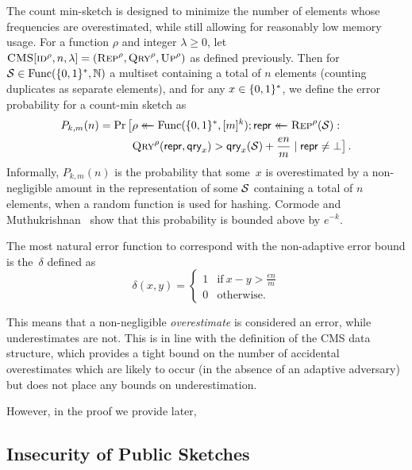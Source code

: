 %
The count min-sketch is designed to minimize the number of elements whose
frequencies are overestimated, while still allowing for reasonably low memory
usage. For a function $\rho$ and integer $\lambda\ge0$, let
$\textnormal{\textsc{CMS}}[\textnormal{\textsc{id}}^\rho,n,\lambda] = (\textnormal{\textsc{Rep}}^\rho,\textnormal{\textsc{Qry}}^\rho,\textnormal{\textsc{Up}}^\rho)$ as defined
previously. Then for $\mathcal{S} \in \mathrm{Func}(\{0,1\}^*,\mathbb{N})$ a multiset containing a total
of $n$ elements (counting duplicates as separate elements), and for any
$x \in \{0,1\}^*$, we define the error probability for a count-min sketch as
\begin{equation}\label{eq:bf-fp}
  \begin{aligned}
    P_{k,m}(n) =
      \Pr\big[&\rho \mathrel{\leftarrow\mkern-14mu\leftarrow} \mathrm{Func}(\{0,1\}^*,[m]^k);
              \mathsf{repr} \mathrel{\leftarrow\mkern-14mu\leftarrow} \textnormal{\textsc{Rep}}^\rho(\mathcal{S}): \\
              &\textnormal{\textsc{Qry}}^\rho(\mathsf{repr}, \mathsf{qry}_x) > \mathsf{qry}_x(\mathcal{S})+\frac{en}{m} \mid \mathsf{repr} \ne \bot
      \big] \,.
  \end{aligned}
\end{equation}
Informally, $P_{k,m}(n)$ is the probability that some~$x$ is overestimated by a
non-negligible amount in the representation of some $\mathcal{S}$ containing a total
of $n$ elements, when a random function is used for hashing. Cormode and
Muthukrishnan~\cite{cormode2005improved} show that this probability is bounded
above by $e^{-k}$.

%
The most natural error function to correspond with the non-adaptive error bound
is the~$\delta$ defined as
\begin{equation}
  \delta(x, y) =
  \begin{cases}
    1 & \text{if}\ x - y > \frac{en}{m} \\
    0 & \text{otherwise.}
  \end{cases}
\end{equation}

This means that a non-negligible \emph{overestimate} is considered an error,
while underestimates are not. This is in line with the definition of the CMS
data structure, which provides a tight bound on the number of accidental
overestimates which are likely to occur (in the absence of an adaptive
adversary) but does not place any bounds on underestimation.

However, in the proof we provide later, 

\subsection{Insecurity of Public Sketches}

